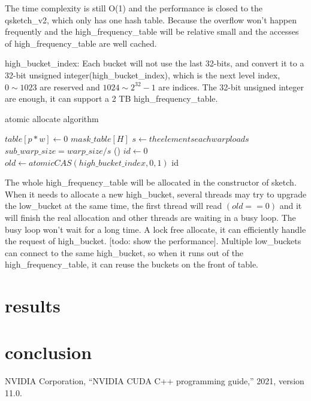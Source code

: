 \documentclass[conference]{IEEEtran}
\begin{document}
The time complexity is still O(1) and the performance is closed to the qsketch\_v2, which only has one hash table. Because the overflow won’t happen frequently and the high\_frequency\_table will be relative small and the accesses of high\_frequency\_table are well cached.

high\_bucket\_index:
Each bucket will not use the last 32-bits, and convert it to a 32-bit unsigned integer(high\_bucket\_index), which is the next level index, $0 \sim 1023$ are reserved and 
$1024 \sim 2 ^ {32} - 1$
are indices. 
The 32-bit unsigned integer are enough, it can support a 2 TB high\_frequency\_table.

\begin{algorithm}[H]
    \DontPrintSemicolon
    \caption{atomic allocate algorithm}
    $table[p * w] \longleftarrow 0$\;
    $mask\_table[H]$\;
    $s \longleftarrow the elements each warp loads$\;
    $sub\_warp\_size = warp\_size / s $\;
\Fn(){}
{
    $id \leftarrow 0$\;
    $old \leftarrow atomicCAS(high\_bucket\_index, 0, 1)$\;
    \KwRet id\;
}
\end{algorithm}


The whole high\_frequency\_table will be allocated in the constructor of sketch. When it needs to allocate a new high\_bucket, several threads may try to upgrade the low\_bucket at the same time, the first thread will read $(old == 0)$ and it will finish the real allocation and other threads are waiting in a busy loop. The busy loop won't wait for a long time.
A lock free allocate, it can efficiently handle the request of high\_bucket. [todo: show the performance].
Multiple low\_buckets can connect to the same high\_bucket, so when it runs out of the high\_frequency\_table, it can reuse the buckets on the front of table.
\section{results}
\section{conclusion}

\begin{thebibliography}{00}
 NVIDIA Corporation, “NVIDIA CUDA C++ programming guide,” 2021, version 11.0.

\end{thebibliography}
\end{document}
